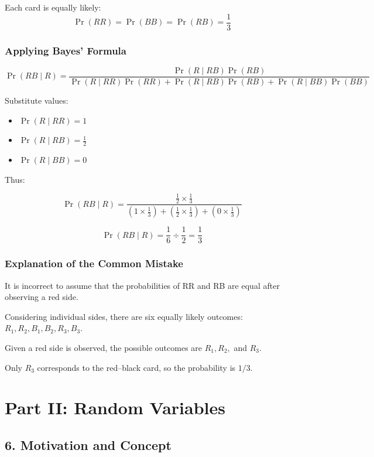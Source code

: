 \documentclass[12pt]{article}
\begin{document}
Each card is equally likely:
\[
\Pr(RR) = \Pr(BB) = \Pr(RB) = \frac{1}{3}
\]

\hrulefill

\subsubsection*{Applying Bayes’ Formula}

\[
\Pr(RB \mid R) =
\frac{\Pr(R \mid RB)\Pr(RB)}
{\Pr(R \mid RR)\Pr(RR) + \Pr(R \mid RB)\Pr(RB) + \Pr(R \mid BB)\Pr(BB)}
\]

Substitute values:

\begin{itemize}
    \item $\Pr(R \mid RR) = 1$
    \item $\Pr(R \mid RB) = \frac{1}{2}$
    \item $\Pr(R \mid BB) = 0$
\end{itemize}

Thus:

\[
\Pr(RB \mid R) =
\frac{\frac{1}{2} \times \frac{1}{3}}
{\left(1 \times \frac{1}{3}\right) + \left(\frac{1}{2} \times \frac{1}{3}\right) + \left(0 \times \frac{1}{3}\right)}
\]

\[
\Pr(RB \mid R) = \frac{1}{6} \div \frac{1}{2} = \frac{1}{3}
\]

\hrulefill

\subsubsection*{Explanation of the Common Mistake}

It is incorrect to assume that the probabilities of RR and RB are equal after observing a red side.

Considering individual sides, there are six equally likely outcomes:
$R_1, R_2, B_1, B_2, R_3, B_3$.

Given a red side is observed, the possible outcomes are $R_1, R_2,$ and $R_3$.

Only $R_3$ corresponds to the red--black card, so the probability is $1/3$.

\hrulefill

\section*{Part II: Random Variables}

\subsection*{6. Motivation and Concept}
\end{document}

